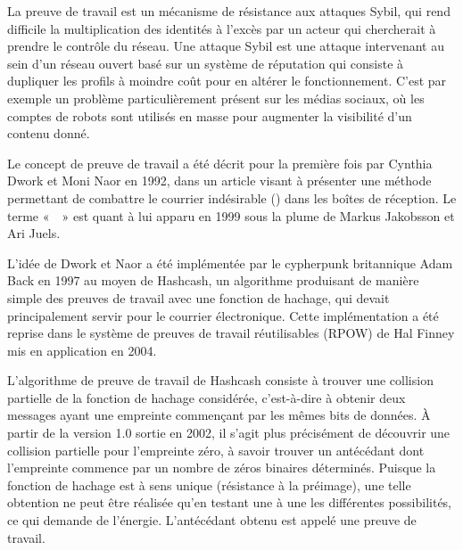 La preuve de travail est un mécanisme de résistance aux attaques Sybil, qui rend difficile la multiplication des identités à l'excès par un acteur qui chercherait à prendre le contrôle du réseau. Une attaque Sybil est une attaque intervenant au sein d'un réseau ouvert basé sur un système de réputation qui consiste à dupliquer les profils à moindre coût pour en altérer le fonctionnement. C'est par exemple un problème particulièrement présent sur les médias sociaux, où les comptes de robots sont utilisés en masse pour augmenter la visibilité d'un contenu donné. %

Le concept de preuve de travail a été décrit pour la première fois par Cynthia Dwork et Moni Naor en 1992, dans un article visant à présenter une méthode permettant de combattre le courrier indésirable () dans les boîtes de réception. Le terme «~~» est quant à lui apparu en 1999 sous la plume de Markus Jakobsson et Ari Juels.

L'idée de Dwork et Naor a été implémentée par le cypherpunk britannique Adam Back en 1997 au moyen de Hashcash, un algorithme produisant de manière simple des preuves de travail avec une fonction de hachage, qui devait principalement servir pour le courrier électronique. Cette implémentation a été reprise dans le système de preuves de travail réutilisables (RPOW) de Hal Finney mis en application en 2004. %


L'algorithme de preuve de travail de Hashcash consiste à trouver une collision partielle de la fonction de hachage considérée, c'est-à-dire à obtenir deux messages ayant une empreinte commençant par les mêmes bits de données. À partir de la version 1.0 sortie en 2002, il s'agit plus précisément de découvrir une collision partielle pour l'empreinte zéro, à savoir trouver un antécédant dont l'empreinte commence par un nombre de zéros binaires déterminés. Puisque la fonction de hachage est à sens unique (résistance à la préimage), une telle obtention ne peut être réalisée qu'en testant une à une les différentes possibilités, ce qui demande de l'énergie. L'antécédant obtenu est appelé une preuve de travail.


